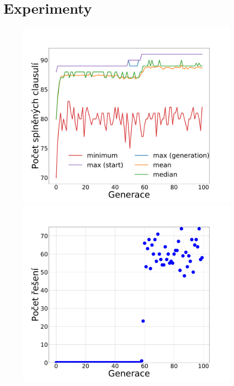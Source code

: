\documentclass[11pt]{article}
\begin{document}
\section{Experimenty}\label{kap:experiments}

\begin{figure}
	\centering
    \begin{minipage}[c]{0.325\textwidth}
        \centering\includegraphics[width=\textwidth]{img/badC.pdf} 
    \end{minipage}
    \begin{minipage}[c]{0.325\textwidth}
        \centering \includegraphics[width=\textwidth]{img/badS.pdf} 

\end{minipage}
\end{figure}
\end{document}
